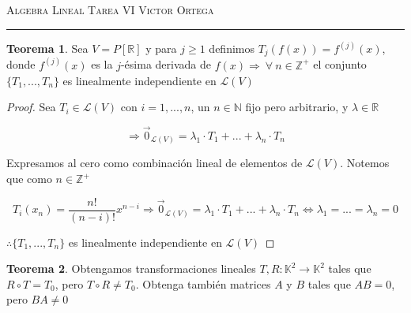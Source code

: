 \documentclass[12pt]{article}
\newcommand\N{\ensuremath{\mathbb{N}}}
\newcommand\K{\ensuremath{\mathbb{K}}}
\newcommand\R{\ensuremath{\mathbb{R}}}
\newcommand\Z{\ensuremath{\mathbb{Z}}}
\begin{document}
\thispagestyle{empty}

{\scshape Algebra Lineal} \hfill {\scshape \large Tarea VI} \hfill {\scshape Victor Ortega}
 
\smallskip

\hrule

\bigskip

\bigskip

\theoremstyle{definition}
\newtheorem*{definition}{Definición}

\theoremstyle{definition}
\newtheorem*{remark}{Observación}

\theoremstyle{definition}
\newtheorem*{dem}{Demostración}

\theoremstyle{definition}
\newtheorem*{notation}{Notación}

\theoremstyle{definition}
\newtheorem*{theorem}{Teorema}

\theoremstyle{definition}
\newtheorem*{lema}{Lema}

\theoremstyle{definition}
\newtheorem*{corollary}{Corollary}

\theoremstyle{remark}
\newtheorem*{observation}{Observación}

\theoremstyle{remark}
\newtheorem*{example}{Ejemplo}


\begin{theorem}
    Sea $V = P[\R]$ y para $j \geqslant 1$ definimos $T_j(f(x)) = f^{(j)}(x)$, donde $f^{(j)}(x)$ es la $j$-ésima derivada de $f(x) \Rightarrow \: \forall \: n \in \Z^+$ el conjunto $\{ T_1, ..., T_n \}$ es linealmente independiente en $\mathcal{L}(V)$
\end{theorem}

\begin{proof}
    Sea $T_i \in \mathcal{L}(V)$ con $i = 1, ..., n$, un $n \in \N$ fijo pero arbitrario, y $\lambda \in \R$

    $$\Rightarrow \vec{0}_{\mathcal{L}(V)} = \lambda_1 \cdot T_1 + ... + \lambda_n \cdot T_n$$

    Expresamos al cero como combinación lineal de elementos de $\mathcal{L}(V)$. Notemos que como $n \in \Z^+$

    $$T_i(x_n) = \frac{n !}{(n-i)!} x^{n-i} \Rightarrow \vec{0}_{\mathcal{L}(V)} = \lambda_1 \cdot T_1 + ... + \lambda_n \cdot T_n \iff \lambda_1 = ... = \lambda_n = 0$$
    
    $\therefore \{ T_1, ..., T_n \}$ es linealmente independiente en $\mathcal{L}(V)$
\end{proof}

\begin{theorem}
    Obtengamos transformaciones lineales $T, R : \K^2 \to \K^2$ tales que $R \circ T = T_0$, pero  $T \circ R \neq T_0$. Obtenga también matrices $A$ y $B$ tales que $AB = 0$, pero $BA \neq 0$ 
\end{theorem}
\end{document}
